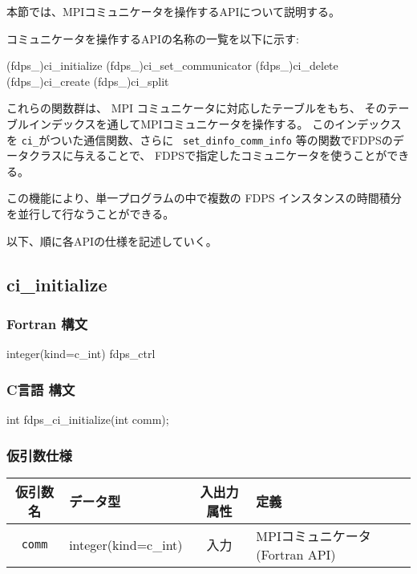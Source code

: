%
%
%

本節では、MPIコミュニケータを操作するAPIについて説明する。


コミュニケータを操作するAPIの名称の一覧を以下に示す:
\begin{screen}
  \begin{spverbatim}
(fdps_)ci_initialize
(fdps_)ci_set_communicator
(fdps_)ci_delete
(fdps_)ci_create
(fdps_)ci_split
\end{spverbatim}
\end{screen}

これらの関数群は、 MPI コミュニケータに対応したテーブルをもち、
そのテーブルインデックスを通してMPIコミュニケータを操作する。
このインデックスを {\tt ci\_}がついた通信関数、さらに {\tt
  set\_dinfo\_comm\_info} 等の関数でFDPSのデータクラスに与えることで、
FDPSで指定したコミュニケータを使うことができる。

この機能により、単一プログラムの中で複数の FDPS インスタンスの時間積分
を並行して行なうことができる。

以下、順に各APIの仕様を記述していく。

\subsection{ci\_initialize}
\subsubsection*{Fortran 構文}
\begin{screen}
\begin{spverbatim}
integer(kind=c_int) fdps_ctrl%
\end{spverbatim}
\end{screen}

\subsubsection*{C言語 構文}
\begin{screen}
\begin{spverbatim}
int fdps_ci_initialize(int comm);
\end{spverbatim}
\end{screen}

\subsubsection*{仮引数仕様}
\begin{table}[h]
\begin{tabularx}{\linewidth}{cXcX}
\toprule
\rowcolor{Snow2}
仮引数名 & データ型 & 入出力属性 & 定義 \\
\midrule
\verb|comm| & integer(kind=c\_int) & 入力 & MPIコミュニケータ(Fortran API)\\
\bottomrule
\end{tabularx}
\end{table}


